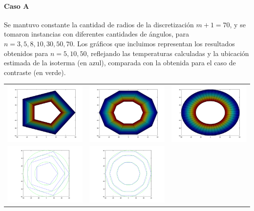     \paragraph{Caso A} Se mantuvo constante la cantidad de radios de la discretización $m + 1 = 70$, y se tomaron instancias con diferentes cantidades de ángulos, para $n = 3, 5, 8, 10, 30, 50, 70$. Los gráficos que incluimos representan los resultados obtenidos para $n = 5, 10, 50$, reflejando las temperaturas calculadas y la ubicación estimada de la isoterma (en azul), comparada con la obtenida para el caso de contraste (en verde).

    {\centering \begin{tabular}{ccc}
      \includegraphics[width=4.5cm]{graficos/1/1a-5.png} &
      \includegraphics[width=4.5cm]{graficos/1/1a-10.png} &
      \includegraphics[width=4.5cm]{graficos/1/1a-50.png} \\
      \includegraphics[width=4.5cm]{graficos/1/1a-5-iso.png} &
      \includegraphics[width=4.5cm]{graficos/1/1a-10-iso.png} &

\end{tabular}}
